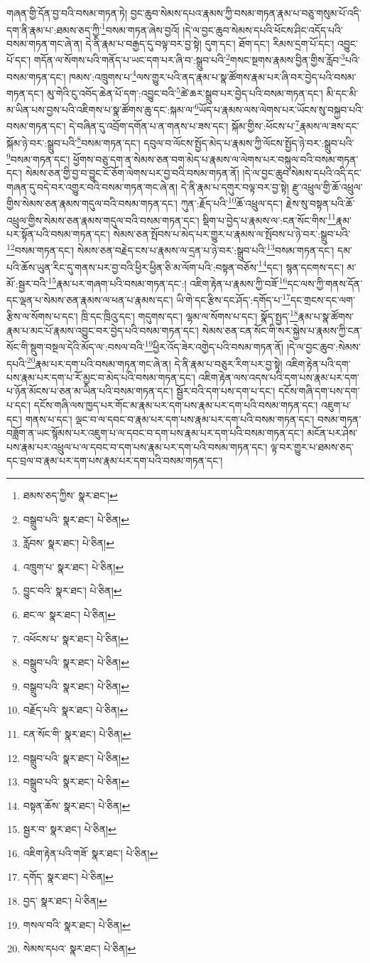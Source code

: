 གཞན་གྱི་དོན་བྱ་བའི་བསམ་གཏན་ཏེ། བྱང་ཆུབ་སེམས་དཔའ་རྣམས་ཀྱི་བསམ་གཏན་རྣམ་པ་བཅུ་གསུམ་པོ་འདི་དག་ནི་རྣམ་པ་:ཐམས་ཅད་ཀྱི་\footnote{ཐམས་ཅད་ཀྱིས་  སྣར་ཐང་། }བསམ་གཏན་ཞེས་བྱའོ། །དེ་ལ་བྱང་ཆུབ་སེམས་དཔའི་ཕོངས་ཤིང་འདོད་པའི་བསམ་གཏན་གང་ཞེ་ན། དེ་ནི་རྣམ་པ་བརྒྱད་དུ་བལྟ་བར་བྱ་སྟེ། དུག་དང་། ཐོག་དང་། རིམས་དྲག་པོ་དང་། འབྱུང་པོ་དང་། གདོན་ལ་སོགས་པའི་གནོད་པ་ཡང་དག་པར་ཞི་བ་:སྒྲུབ་པའི་\footnote{བསྒྲུབ་པའི་  སྣར་ཐང་།  པེ་ཅིན། }གསང་སྔགས་རྣམས་བྱིན་གྱིས་རློབ་\footnote{རློབས་  སྣར་ཐང་།  པེ་ཅིན། }པའི་བསམ་གཏན་དང་། ཁམས་:འཁྲུགས་པ་\footnote{འཁྲུག་པ་  སྣར་ཐང་།  པེ་ཅིན། }ལས་གྱུར་པའི་ནད་རྣམ་པ་སྣ་ཚོགས་རྣམ་པར་ཞི་བར་བྱེད་པའི་བསམ་གཏན་དང་། མུ་གེའི་ངུ་འབོད་ཆེན་པོ་དག་:འབྱུང་བའི་\footnote{བྱུང་བའི་  སྣར་ཐང་།  པེ་ཅིན། }ཚེ་ཆར་སྒྲུབ་པར་བྱེད་པའི་བསམ་གཏན་དང་། མི་དང་མི་མ་ཡིན་པས་བྱས་པའི་འཇིགས་པ་སྣ་ཚོགས་ཆུ་དང་:སྐམ་ལ་\footnote{ཐང་ལ་  སྣར་ཐང་།  པེ་ཅིན། }ཡོད་པ་རྣམས་ལས་ལེགས་པར་ཡོངས་སུ་བསྐྱབ་པའི་བསམ་གཏན་དང་། དེ་བཞིན་དུ་འབྲོག་དགོན་པ་ན་གནས་པ་ཟས་དང་། སྐོམ་གྱིས་:ཕོངས་པ་\footnote{འཕོངས་པ་  སྣར་ཐང་།  པེ་ཅིན། }རྣམས་ལ་ཟས་དང་སྐོམ་ཉེ་བར་:སྒྲུབ་པའི་\footnote{བསྒྲུབ་པའི་  སྣར་ཐང་།  པེ་ཅིན། }བསམ་གཏན་དང་། དབུལ་བ་ལོངས་སྤྱོད་མེད་པ་རྣམས་ཀྱི་ལོངས་སྤྱོད་ཉེ་བར་:སྒྲུབ་པའི་\footnote{བསྒྲུབ་པའི་  སྣར་ཐང་།  པེ་ཅིན། }བསམ་གཏན་དང་། ཕྱོགས་བཅུ་དག་ན་སེམས་ཅན་བག་མེད་པ་རྣམས་ལ་ལེགས་པར་བསྐུལ་བའི་བསམ་གཏན་དང་། སེམས་ཅན་གྱི་བྱ་བ་བྱུང་ངོ་ཅོག་ལེགས་པར་བྱ་བའི་བསམ་གཏན་ནོ། །དེ་ལ་བྱང་ཆུབ་སེམས་དཔའི་འདི་དང་གཞན་དུ་བདེ་བར་འགྱུར་བའི་བསམ་གཏན་གང་ཞེ་ན། དེ་ནི་རྣམ་པ་དགུར་བལྟ་བར་བྱ་སྟེ། རྫུ་འཕྲུལ་གྱི་ཆོ་འཕྲུལ་གྱིས་སེམས་ཅན་རྣམས་གདུལ་བའི་བསམ་གཏན་དང་། ཀུན་:རྗོད་པའི་\footnote{བརྗོད་པའི་  སྣར་ཐང་།  པེ་ཅིན། }ཆོ་འཕྲུལ་དང་། རྗེས་སུ་བསྟན་པའི་ཆོ་འཕྲུལ་གྱིས་སེམས་ཅན་རྣམས་གདུལ་བའི་བསམ་གཏན་དང་། སྡིག་པ་བྱེད་པ་རྣམས་ལ་:ངན་སོང་གིས་\footnote{ངན་སོང་གི་  སྣར་ཐང་།  པེ་ཅིན། }རྣམ་པར་སྟོན་པའི་བསམ་གཏན་དང་། སེམས་ཅན་སྤོབས་པ་མེད་པར་གྱུར་པ་རྣམས་ལ་སྤོབས་པ་ཉེ་བར་:སྒྲུབ་པའི་\footnote{བསྒྲུབ་པའི་  སྣར་ཐང་།  པེ་ཅིན། }བསམ་གཏན་དང་། སེམས་ཅན་བརྗེད་ངས་པ་རྣམས་ལ་དྲན་པ་ཉེ་བར་:སྒྲུབ་པའི་\footnote{བསྒྲུབ་པའི་  སྣར་ཐང་།  པེ་ཅིན། }བསམ་གཏན་དང་། དམ་པའི་ཆོས་ཡུན་རིང་དུ་གནས་པར་བྱ་བའི་ཕྱིར་ཕྱིན་ཅི་མ་ལོག་པའི་:བསྟན་བཅོས་\footnote{བསྟན་ཆོས་  སྣར་ཐང་།  པེ་ཅིན། }དང་། སྙན་དངགས་དང་། མ་མོ་:སྦྱར་བའི་\footnote{སྦྱར་བ་  སྣར་ཐང་།  པེ་ཅིན། }རྣམ་པར་གཞག་པའི་བསམ་གཏན་དང་:། འཇིག་རྟེན་པ་རྣམས་ཀྱི་བཟོ་\footnote{འཇིག་རྟེན་པའི་གཟོ་  སྣར་ཐང་།  པེ་ཅིན། }དང་ལས་ཀྱི་གནས་དོན་དང་ལྡན་པ་སེམས་ཅན་རྣམས་ལ་ཕན་པ་རྣམས་དང་། ཡི་གེ་དང་རྩིས་དང་ཤོད་:དགོད་པ་\footnote{དགོད་  སྣར་ཐང་།  པེ་ཅིན། }དང་གྲངས་དང་ལག་རྩིས་ལ་སོགས་པ་དང་། ཁྲི་དང་ཁྲིའུ་དང་། གདུགས་དང་། ལྷམ་ལ་སོགས་པ་དང་། སྣོད་སྤྱད་\footnote{བྱད་  སྣར་ཐང་།  པེ་ཅིན། }རྣམ་པ་སྣ་ཚོགས་རྣམ་པ་མང་པོ་རྣམས་འབྱུང་བར་བྱེད་པའི་བསམ་གཏན་དང་། སེམས་ཅན་ངན་སོང་གི་སར་སྐྱེས་པ་རྣམས་ཀྱི་ངན་སོང་གི་སྡུག་བསྔལ་དེའི་མོད་ལ་:བསལ་བའི་\footnote{གསལ་བའི་  སྣར་ཐང་།  པེ་ཅིན། }ཕྱིར་འོད་ཟེར་འགྱེད་པའི་བསམ་གཏན་ནོ། །དེ་ལ་བྱང་ཆུབ་:སེམས་དཔའི་\footnote{སེམས་དཔའ་  སྣར་ཐང་།  པེ་ཅིན། }རྣམ་པར་དག་པའི་བསམ་གཏན་གང་ཞེ་ན། དེ་ནི་རྣམ་པ་བཅུར་རིག་པར་བྱ་སྟེ། འཇིག་རྟེན་པའི་དག་པས་རྣམ་པར་དག་པ་རོ་མྱང་བ་མེད་པའི་བསམ་གཏན་དང་། འཇིག་རྟེན་ལས་འདས་པའི་དག་པས་རྣམ་པར་དག་པ་ཉོན་མོངས་པ་ཅན་མ་ཡིན་པའི་བསམ་གཏན་དང་། སྦྱོར་བའི་དག་པས་དག་པ་དང་། དངོས་གཞི་དག་པས་དག་པ་དང་། དངོས་གཞི་ལས་ཁྱད་པར་གོང་མ་རྣམ་པར་དག་པས་རྣམ་པར་དག་པའི་བསམ་གཏན་དང་། འཇུག་པ་དང་། གནས་པ་དང་། ལྡང་བ་ལ་དབང་བ་རྣམ་པར་དག་པས་རྣམ་པར་དག་པའི་བསམ་གཏན་དང་། བསམ་གཏན་བཟློག་ན་ཡང་སྙོམས་པར་འཇུག་པ་ལ་དབང་བ་དག་པས་རྣམ་པར་དག་པའི་བསམ་གཏན་དང་། མངོན་པར་ཤེས་པས་རྣམ་པར་འཕྲུལ་པ་ལ་དབང་བ་དག་པས་རྣམ་པར་དག་པའི་བསམ་གཏན་དང་། ལྟ་བར་གྱུར་པ་ཐམས་ཅད་དང་བྲལ་བ་རྣམ་པར་དག་པས་རྣམ་པར་དག་པའི་བསམ་གཏན་དང་། 
